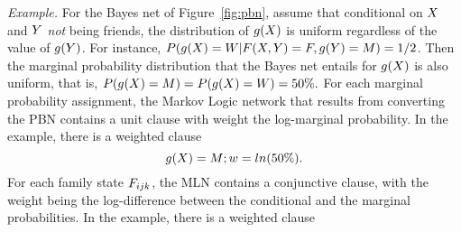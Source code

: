 \documentclass[twoside,leqno,twocolumn]{article}
\begin{document}
%
{\em Example.} For the Bayes net of Figure~\ref{fig:pbn}, assume that conditional on $X$ and $Y$ {\em not} being friends, the distribution of $g(X)$ is  uniform regardless of the value of $g(Y)$. For instance, $P(g(X)=W|F(X,Y) = F, g(Y) = M) = 1/2$. Then the marginal probability distribution that the Bayes net entails for $g(X)$ is also uniform, that is, $P(g(X) = M) = P(g(X) = W) = 50\%.$
%
For each marginal probability assignment, the Markov Logic network that results from converting the PBN contains a unit clause with weight the log-marginal probability. In the example, there is a weighted clause \[g(X) = M; w = ln(50\%). \]
For each family state $F_{ijk}$, the MLN contains a conjunctive clause, with the weight being the log-difference between the conditional and the marginal probabilities. In the example, there is a weighted clause 
\end{document}
